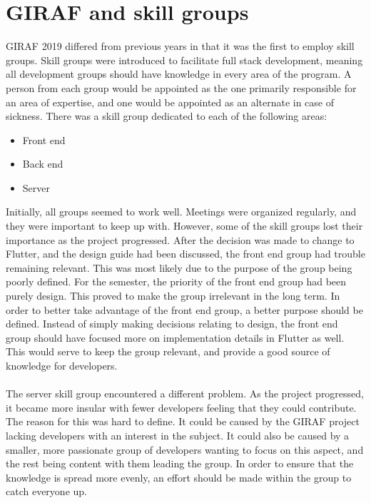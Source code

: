 \section{GIRAF and skill groups}
GIRAF 2019 differed from previous years in that it was the first to employ skill groups.
Skill groups were introduced to facilitate full stack development, meaning all development groups should have knowledge in every area of the program.
A person from each group would be appointed as the one primarily responsible for an area of expertise, and one would be appointed as an alternate in case of sickness.
There was a skill group dedicated to each of the following areas:
\begin{itemize}
    \item Front end
    \item Back end
    \item Server
\end{itemize} 
\noindent
Initially, all groups seemed to work well. 
Meetings were organized regularly, and they were important to keep up with.
However, some of the skill groups lost their importance as the project progressed.
After the decision was made to change to Flutter, and the design guide had been discussed, the front end group had trouble remaining relevant.
This was most likely due to the purpose of the group being poorly defined.
For the semester, the priority of the front end group had been purely design.
This proved to make the group irrelevant in the long term.
In order to better take advantage of the front end group, a better purpose should be defined.
Instead of simply making decisions relating to design, the front end group should have focused more on implementation details in Flutter as well.
This would serve to keep the group relevant, and provide a good source of knowledge for developers.
\\\\
The server skill group encountered a different problem.
As the project progressed, it became more insular with fewer developers feeling that they could contribute.
The reason for this was hard to define.
It could be caused by the GIRAF project lacking developers with an interest in the subject.
It could also be caused by a smaller, more passionate group of developers wanting to focus on this aspect, and the rest being content with them leading the group.
In order to ensure that the knowledge is spread more evenly, an effort should be made within the group to catch everyone up.
\\\\
